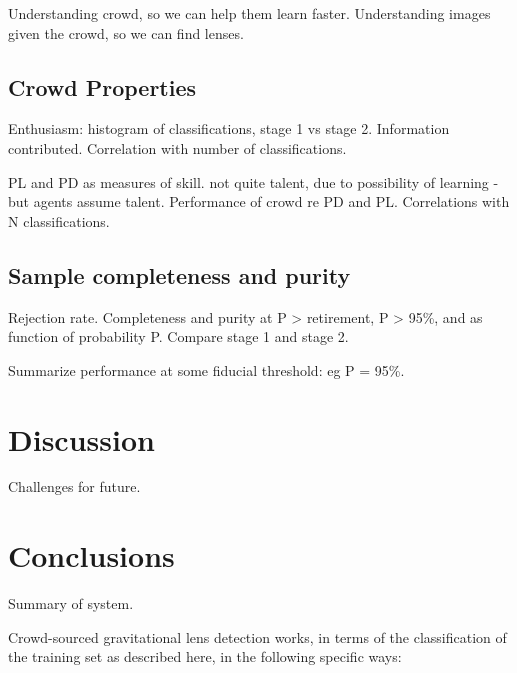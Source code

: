 \documentclass[useAMS,usenatbib,a4paper]{mn2e}
\begin{document}
Understanding crowd, so we can help them learn faster. Understanding
images given the crowd, so we can find lenses.


\subsection{Crowd Properties}
\label{sec:results:crowd}

Enthusiasm: histogram of classifications, stage 1 vs stage 2. Information
contributed. Correlation with number of classifications. 

PL and PD as measures of skill. not quite talent, due to possibility of
learning - but agents assume talent. Performance of crowd re PD and PL.
Correlations with N classifications.



\subsection{Sample completeness and purity}
\label{sec:results:sample}

Rejection rate. Completeness and purity at P > retirement, P > 95\%, and 
as function of probability P. Compare stage 1 and stage 2. 

Summarize performance at some fiducial threshold: eg P = 95\%.



\section{Discussion}
\label{sec:discuss}

Challenges for future.


\section{Conclusions}
\label{sec:conclude}

Summary of system.

Crowd-sourced gravitational lens detection works, in terms of the
classification of the training set as described here, in the following
specific ways: 
\end{document}
